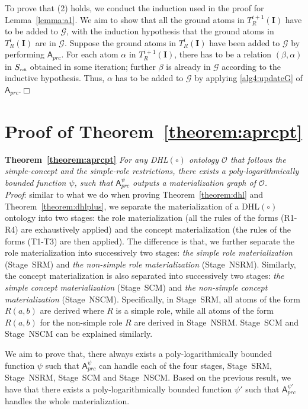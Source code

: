 To prove that (2) holds, we conduct the induction used in the proof for Lemma~\ref{lemma:a1}.
We aim to show that all the ground atoms in $T_R^{i+1}(\textbf{I})$ have to be added to $\mathcal{G}$,
with the induction hypothesis that the ground atoms in $T_R^{i}(\textbf{I})$ are in $\mathcal{G}$.
Suppose the ground atoms in $T_R^{i}(\textbf{I})$ have been added to $\mathcal{G}$ by
performing $\mathsf{A}_{prc}$.
For each atom $\alpha$ in $T_R^{i+1}(\textbf{I})$, there has to be a relation $(\beta,\alpha)$
in $S_{\textit{\tiny rch}}$ obtained in some iteration; further
$\beta$ is already in $\mathcal{G}$ according to the inductive hypothesis. Thus,
$\alpha$ has to be added to $\mathcal{G}$ by applying \ref{alg4:updateG}
of $\mathsf{A}_{prc}$.\hfill$\Box$


\section{Proof of Theorem~\ref{theorem:aprcpt}}

\textbf{Theorem~\ref{theorem:aprcpt}}
\emph{For any DHL$(\circ)$ ontology $\mathcal{O}$ that follows the simple-concept and the simple-role
restrictions,
there exists a poly-logarithmically bounded function $\psi$,
such that $\mathsf{A}_{prc}^{\psi}$ outputs
a materialization graph of $\mathcal{O}$.}\\

\noindent\emph{Proof}: similar to what we do when proving
Theorem~\ref{theorem:dhl} and Theorem~\ref{theorem:dhlplus},
we separate the materialization of a DHL$(\circ)$ ontology
into two stages: the role materialization (all the rules
of the forms (R1-R4) are exhaustively applied) and the concept materialization
(the rules of the forms (T1-T3)
are then applied). The difference is that, we further separate the role materialization
into successively two stages: \emph{the simple role materialization} (Stage~SRM) and
\emph{the non-simple role materialization} (Stage~NSRM).
Similarly, the concept materialization is also separated into successively two stages:
\emph{the simple concept materialization} (Stage~SCM) and
\emph{the non-simple concept materialization} (Stage~NSCM).
Specifically, in Stage~SRM, all atoms of the form $R(a,b)$ are derived
where $R$ is a simple role, while all atoms of the form $R(a,b)$ for the non-simple
role $R$ are derived in Stage~NSRM. Stage~SCM and Stage~NSCM can be explained similarly.

We aim to prove that, there always exists a poly-logarithmically bounded function $\psi$
such that $\mathsf{A}_{prc}^{\psi}$ can handle each of the four stages, Stage~SRM,
Stage~NSRM, Stage~SCM and Stage~NSCM. Based on the previous result, we have that
there exists a poly-logarithmically bounded function $\psi'$
such that $\mathsf{A}_{prc}^{\psi'}$ handles the whole materialization.

